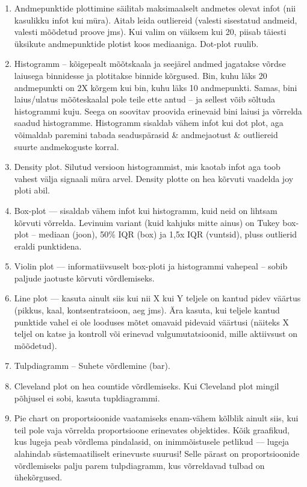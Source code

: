 \documentclass[]{book}
\begin{document}
\begin{enumerate}
\def\labelenumi{\arabic{enumi}.}
\item
  Andmepunktide plottimine säilitab maksimaalselt andmetes olevat infot
  (nii kasulikku infot kui müra). Aitab leida outliereid (valesti
  sisestatud andmeid, valesti mõõdetud proove jms). Kui valim on väiksem
  kui 20, piisab täiesti üksikute andmepunktide plotist koos mediaaniga.
  Dot-plot ruulib.
\item
  Histogramm -- kõigepealt mõõtskaala ja seejärel andmed jagatakse
  võrdse laiusega binnidesse ja plotitakse binnide kõrgused. Bin, kuhu
  läks 20 andmepunkti on 2X kõrgem kui bin, kuhu läks 10 andmepunkti.
  Samas, bini laius/ulatus mõõteskaalal pole teile ette antud -- ja
  sellest võib sõltuda histogrammi kuju. Seega on soovitav proovida
  erinevaid bini laiusi ja võrrelda saadud histogramme. Histogramm
  sisaldab vähem infot kui dot plot, aga võimaldab paremini tabada
  seaduspärasid \& andmejaotust \& outliereid suurte andmekoguste
  korral.
\item
  Density plot. Silutud versioon histogrammist, mis kaotab infot aga
  toob vahest välja signaali müra arvel. Density plotte on hea kõrvuti
  vaadelda joy ploti abil.
\item
  Box-plot --- sisaldab vähem infot kui histogramm, kuid neid on lihtsam
  kõrvuti võrrelda. Levinuim variant (kuid kahjuks mitte ainus) on Tukey
  box-plot -- mediaan (joon), 50\% IQR (box) ja 1,5x IQR (vuntsid),
  pluss outlierid eraldi punktidena.
\item
  Violin plot --- informatiivsuselt box-ploti ja histogrammi vahepeal --
  sobib paljude jaotuste kõrvuti võrdlemiseks.
\item
  Line plot --- kasuta ainult siis kui nii X kui Y teljele on kantud
  pidev väärtus (pikkus, kaal, kontsentratsioon, aeg jms). Ära kasuta,
  kui teljele kantud punktide vahel ei ole looduses mõtet omavaid
  pidevaid väärtusi (näiteks X teljel on katse ja kontroll või erinevad
  valgumutatsioonid, mille aktiivsust on mõõdetud).
\item
  Tulpdiagramm -- Suhete võrdlemine (bar).
\item
  Cleveland plot on hea countide võrdlemiseks. Kui Cleveland plot mingil
  põhjusel ei sobi, kasuta tupldiagrammi.
\item
  Pie chart on proportsioonide vaatamiseks enam-vähem kõlblik ainult
  siis, kui teil pole vaja võrrelda proportsioone erinevates objektides.
  Kõik graafikud, kus lugeja peab võrdlema pindalasid, on inimmõistusele
  petlikud --- lugeja alahindab süstemaatiliselt erinevuste suurusi!
  Selle pärast on proportsioonide võrdlemiseks palju parem tulpdiagramm,
  kus võrreldavad tulbad on ühekõrgused.
\end{enumerate}
\end{document}
